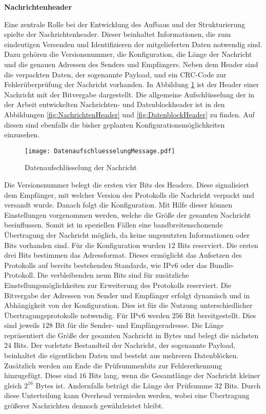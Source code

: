 \label{sec:ProtokolDesign}

\textbf{Nachrichtenheader}

Eine zentrale Rolle bei der Entwicklung des Aufbaus und der Strukturierung
spielte der Nachrichtenheader.
Dieser beinhaltet Informationen, die zum eindeutigen Versenden und Identifizieren der
mitgelieferten Daten notwendig sind. Dazu gehören die Versionsnummer,
die Konfiguration, die Länge der Nachricht und die genauen Adressen
des Senders und Empfängers. Neben dem Header sind die verpackten Daten, der
sogenannte Payload, und ein CRC-Code zur Fehlerüberprüfung der Nachricht
vorhanden. In Abbildung \ref{fig:DatenaufschluesselungMessage} ist der Header
einer Nachricht mit der Bitvergabe dargestellt. Die allgemeine Aufschlüsselung
der in der Arbeit entwickelten Nachrichten- und Datenblockheader ist in den
Abbildungen \ref{fig:NachrichtenHeader} und \ref{fig:DatenblockHeader} zu
finden. Auf diesen sind ebenfalls die bisher geplanten
Konfigurationsmöglichkeiten einzusehen.

\begin{figure}[H]
	\centering
	\texttt{[image: DatenaufschluesselungMessage.pdf]}
	\caption{Datenaufschlüsselung der Nachricht}
	\label{fig:DatenaufschluesselungMessage}
\end{figure}

Die Versionsnummer belegt die ersten vier Bits des Headers. Diese
signalisiert dem Empfänger, mit welcher Version des Protokolls die Nachricht
verpackt und versandt wurde. Danach folgt die Konfiguration. Mit Hilfe dieser
können Einstellungen vorgenommen werden, welche die Größe der gesamten Nachricht
beeinflussen. Somit ist in speziellen Fällen eine bandbreitenschonende
Übertragung der Nachricht möglich, da keine ungenutzten Informationen oder Bits
vorhanden sind. Für die Konfiguration wurden $12$ Bits reserviert. Die ersten
drei Bits bestimmen das Adressformat. Dieses ermöglicht das Aufsetzen des
Protokolls auf bereits bestehenden Standards, wie IPv6 oder das Bundle-Protokoll.
Die verbleibenden neun Bits sind für zusätzliche Einstellungsmöglichkeiten zur
Erweiterung des Protokolls reserviert. Die Bitvergabe der Adressen von Sender
und Empfänger erfolgt dynamisch und in Abhängigkeit von der Konfiguration.
Dies ist für die Nutzung unterschiedlicher Übertragungsprotokolle notwendig.
Für IPv6 werden $256$ Bit bereitgestellt. Dies sind jeweils $128$ Bit für
die Sender- und Empfängeradresse. Die Länge repräsentiert die Größe der gesamten
Nachricht in Bytes und belegt die nächsten $24$ Bits. \newline
Der vorletzte Bestandteil der Nachricht, der sogenannte Payload, beinhaltet die
eigentlichen Daten und besteht aus mehreren Datenblöcken. Zusätzlich werden am
Ende die Prüfsummenbits zur Fehlererkennung hinzugefügt. Diese sind $16$ Bits lang,
wenn die Gesamtlänge der Nachricht kleiner gleich $2^{16}$ Bytes ist.
Andernfalls beträgt die Länge der Prüfsumme $32$ Bits. Durch diese Unterteilung
kann Overhead vermieden werden, wobei eine {\"U}bertragung gr{\"o}{\ss}erer
Nachrichten dennoch gew{\"a}hrleistet bleibt.

